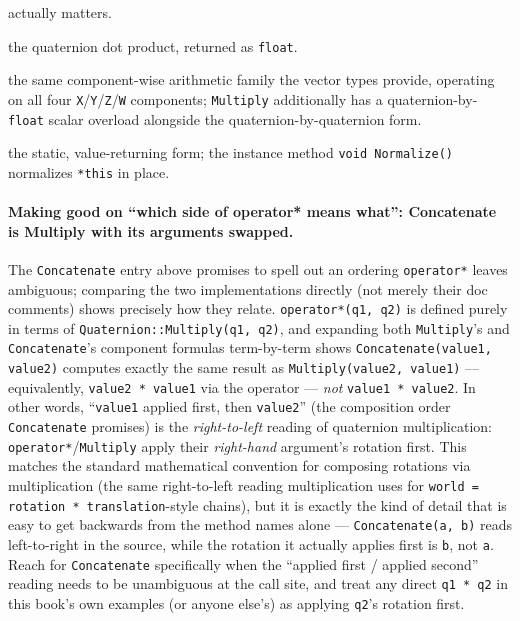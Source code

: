 \begin{description}
  actually matters.
\item[\texttt{Dot(quaternion1, quaternion2)}] the quaternion dot product, returned as
  \texttt{float}.
\item[\texttt{Add}/\texttt{Subtract}/\texttt{Multiply}/\texttt{Divide}/\texttt{Negate}] the same
  component-wise arithmetic family the vector types provide, operating on all four
  \texttt{X}/\texttt{Y}/\texttt{Z}/\texttt{W} components; \texttt{Multiply} additionally has a
  quaternion-by-\texttt{float} scalar overload alongside the quaternion-by-quaternion form.
\item[\texttt{Normalize(quaternion)}] the static, value-returning form; the instance method
  \texttt{void Normalize()} normalizes \texttt{*this} in place.
\end{description}

\paragraph{Making good on ``which side of operator* means what'': Concatenate is Multiply with its arguments swapped.}
The \texttt{Concatenate} entry above promises to spell out an ordering \texttt{operator*}
leaves ambiguous; comparing the two implementations directly (not merely their doc comments)
shows precisely how they relate. \texttt{operator*(q1, q2)} is defined purely in terms of
\texttt{Quaternion::Multiply(q1, q2)}, and expanding both \texttt{Multiply}'s and
\texttt{Concatenate}'s component formulas term-by-term shows
\texttt{Concatenate(value1, value2)} computes exactly the same result as
\texttt{Multiply(value2, value1)} --- equivalently, \texttt{value2 * value1} via the operator
--- \emph{not} \texttt{value1 * value2}. In other words, ``\texttt{value1} applied first, then
\texttt{value2}'' (the composition order \texttt{Concatenate} promises) is the
\emph{right-to-left} reading of quaternion multiplication: \texttt{operator*}/\texttt{Multiply}
apply their \emph{right-hand} argument's rotation first. This matches the standard mathematical
convention for composing rotations via multiplication (the same right-to-left reading
 multiplication uses for \texttt{world = rotation * translation}-style
chains), but it is exactly the kind of detail that is easy to get backwards from the method
names alone --- \texttt{Concatenate(a, b)} reads left-to-right in the source, while the
rotation it actually applies first is \texttt{b}, not \texttt{a}. Reach for
\texttt{Concatenate} specifically when the ``applied first / applied second'' reading needs to
be unambiguous at the call site, and treat any direct \texttt{q1 * q2} in this book's own
examples (or anyone else's) as applying \texttt{q2}'s rotation first.


